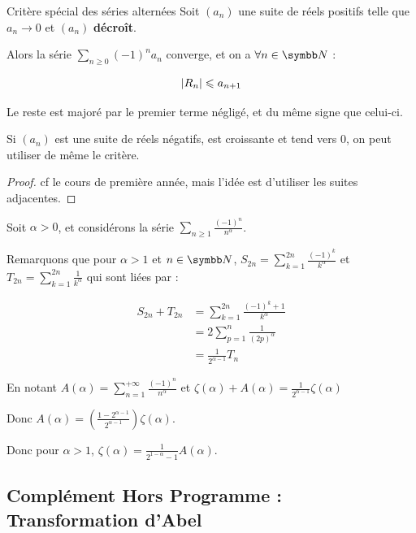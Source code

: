 \begin{theoreme}{Critère spécial des séries alternées}{}
    Soit $(a_n)$ une suite de réels positifs telle que $a_n \longrightarrow 0$ et $(a_n)$ \textbf{décroît}. 

    Alors la série $\sum_{n \geqslant 0} (-1)^n a_n$ converge, et on a $\forall n \in \N$ : 

    \[\left|R_n\right| \leqslant a_{n + 1}\]

    Le reste est majoré par le premier terme négligé, et du même signe que celui-ci.
\end{theoreme}

\begin{remarque}
    Si $(a_n)$ est une suite de réels négatifs, est croissante et tend vers $0$, on peut utiliser de même le critère.
\end{remarque}

\begin{proof}
    cf le cours de première année, mais l'idée est d'utiliser les suites adjacentes. 
\end{proof}

\begin{exemple}
    Soit $\alpha > 0$, et considérons la série $\sum_{n \geqslant 1} \frac{(-1)^n }{n^\alpha}$.

    Remarquons que pour $\alpha > 1$ et $n \in \N$, $\displaystyle S_{2n} = \sum_{k = 1}^{2n} \frac{(-1)^k}{k^\alpha}$ et 
    $\displaystyle T_{2n} = \sum_{k = 1 }^{2n} \frac{1}{k^\alpha}$ qui sont liées par : 

    \begin{align*}
        S_{2n} + T_{2n} & = \sum_{k = 1}^{2n} \frac{(-1)^k + 1}{k^\alpha} \\
                        & = 2 \sum_{p = 1}^{n} \frac{1}{(2p)^\alpha} \\
                        & = \frac{1}{2^{\alpha - 1}} T_n 
    \end{align*}

    En notant $\displaystyle A(\alpha) = \sum_{n = 1}^{+\infty} \frac{(-1)^n}{n^\alpha}$ et $\displaystyle \zeta(\alpha) + A(\alpha) = \frac{1}{2^{\alpha - 1}} \zeta(\alpha)$

    Donc $A(\alpha) = \left( \frac{1 - 2^{\alpha - 1}}{2^{\alpha - 1}} \right) \zeta(\alpha)$.

    Donc pour $\alpha > 1$, $\displaystyle \zeta(\alpha) = \frac 1 {2^{1 - \alpha} - 1} A(\alpha)$.
\end{exemple}

\subsection{Complément Hors Programme : Transformation d'Abel}

